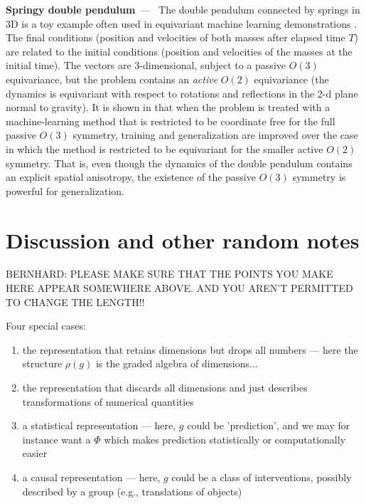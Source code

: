 \documentclass{article}
\renewcommand{\paragraph}[1]{\par\textbf{#1}~---~}
\begin{document}
\paragraph{Springy double pendulum}
The double pendulum connected by springs in 3D is a toy example often used in equivariant machine learning demonstrations \cite{finzi2021practical; yao2021simple}. 
The final conditions (position and velocities of both masses after elapsed time $T$) are related to the initial conditions (position and velocities of the masses at the initial time).
The vectors are 3-dimensional, subject to a passive $O(3)$ equivariance, but the problem contains an \emph{active} $O(2)$ equivariance (the dynamics is equivariant with respect to rotations and reflections in the 2-d plane normal to gravity).
It is shown in \cite{yao2021simple} that when the problem is treated with a machine-learning method that is restricted to be coordinate free for the full passive $O(3)$ symmetry, training and generalization are improved over the case in which the method is restricted to be equivariant for the smaller active $O(2)$ symmetry.
That is, even though the dynamics of the double pendulum contains an explicit spatial anisotropy, the existence of the passive $O(3)$ symmetry is powerful for generalization.

\section{Discussion and other random notes}
BERNHARD: PLEASE MAKE SURE THAT THE POINTS YOU MAKE HERE APPEAR SOMEWHERE ABOVE. AND YOU AREN'T PERMITTED TO CHANGE THE LENGTH!!

Four special cases:
\begin{enumerate}
    \item the representation that retains dimensions but drops all numbers --- here the structure $\rho(g)$ is the graded algebra of dimensions...
    \item the representation that discards all dimensions and just describes transformations of numerical quantities
    \item a statistical representation --- here, $g$ could be 'prediction', and we may for instance want a $\Phi$ which makes prediction statistically or computationally easier
    \item a causal representation --- here, $g$ could be a class of interventions, possibly described by a group (e.g., translations of objects)
\end{enumerate}
\end{document}
